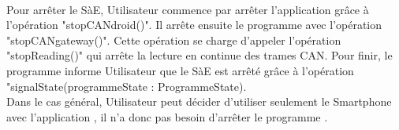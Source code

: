 \\ 
Pour arrêter le SàE, Utilisateur commence par arrêter l'application {\nomApplication} grâce à l'opération "stopCANdroid()". Il arrête ensuite le programme {\nomLogiciel} avec l'opération "stopCANgateway()". Cette opération se charge d'appeler l'opération "stopReading()" qui arrête la lecture en continue des trames CAN. Pour finir, le programme {\nomLogiciel} informe Utilisateur que le SàE est arrêté grâce à l'opération "signalState(programmeState : ProgrammeState). \\

Dans le cas général, Utilisateur peut décider d'utiliser seulement le Smartphone avec l'application {\nomApplication}, il n'a donc pas besoin d'arrêter le programme {\nomLogiciel}. \\